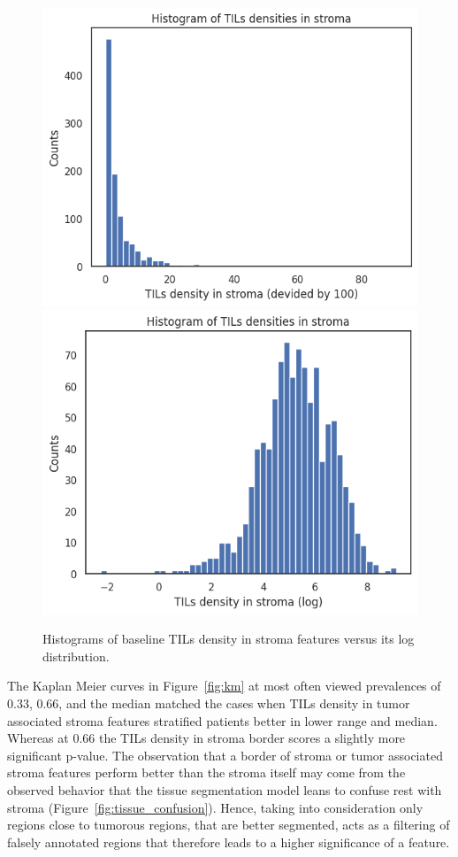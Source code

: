\begin{figure}[H]
\centering
\includegraphics[width=0.4\linewidth]{figures/survival/histo_tils.png}
\includegraphics[width=0.4\linewidth]{figures/survival/histo_tils_log.png}
\caption{Histograms of baseline TILs density in stroma features versus its log distribution.}
\label{fig:histo_tils}
\end{figure}
    

The Kaplan Meier curves in Figure~\ref{fig:km} at most often viewed prevalences of
0.33, 0.66, and the median matched the cases when TILs density in tumor associated
stroma features stratified patients better in lower range and median.
Whereas at 0.66 the TILs density in stroma border scores a slightly more significant p-value.
The observation that a border of stroma or tumor associated stroma features perform better
than the stroma itself may come from the observed behavior that the tissue segmentation model
leans to confuse rest with stroma (Figure~\ref{fig:tissue_confusion}).
Hence, taking into consideration only regions close to tumorous regions, that are better
segmented, acts as a filtering of falsely annotated regions that therefore leads to a higher
significance of a feature.


